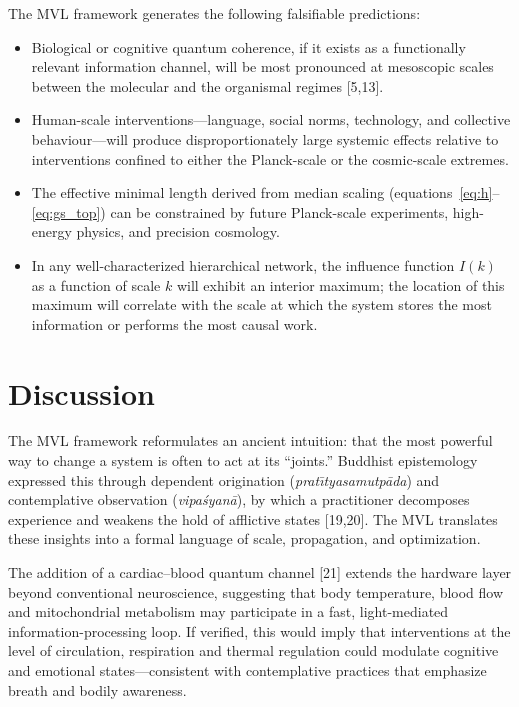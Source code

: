 \documentclass[11pt,a4paper]{article}
\begin{document}
The MVL framework generates the following falsifiable predictions:

\begin{itemize}
  \item[\textbf{MVL-1.}] Biological or cognitive quantum coherence, if it exists as a functionally relevant information channel, will be most pronounced at mesoscopic scales between the molecular and the organismal regimes [5,13].
  \item[\textbf{MVL-2.}] Human-scale interventions---language, social norms, technology, and collective behaviour---will produce disproportionately large systemic effects relative to interventions confined to either the Planck-scale or the cosmic-scale extremes.
  \item[\textbf{MVL-3.}] The effective minimal length derived from median scaling (equations~\ref{eq:h}--\ref{eq:gs_top}) can be constrained by future Planck-scale experiments, high-energy physics, and precision cosmology.
  \item[\textbf{MVL-4.}] In any well-characterized hierarchical network, the influence function $I(k)$ as a function of scale $k$ will exhibit an interior maximum; the location of this maximum will correlate with the scale at which the system stores the most information or performs the most causal work.
\end{itemize}

\section{Discussion}

The MVL framework reformulates an ancient intuition: that the most powerful way to change a system is often to act at its ``joints.'' Buddhist epistemology expressed this through dependent origination (\textit{prat\={\i}tyasamutp\={a}da}) and contemplative observation (\textit{vipa\'{s}yan\={a}}), by which a practitioner decomposes experience and weakens the hold of afflictive states [19,20]. The MVL translates these insights into a formal language of scale, propagation, and optimization.

The addition of a cardiac--blood quantum channel [21] extends the hardware layer beyond conventional neuroscience, suggesting that body temperature, blood flow and mitochondrial metabolism may participate in a fast, light-mediated information-processing loop. If verified, this would imply that interventions at the level of circulation, respiration and thermal regulation could modulate cognitive and emotional states---consistent with contemplative practices that emphasize breath and bodily awareness.
\end{document}
